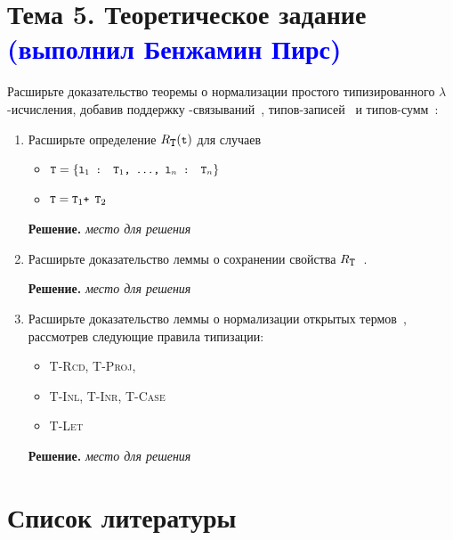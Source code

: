 \documentclass[dvipsnames]{article}
\let\smallcodeOrig\smallcode
\renewcommand{\smallcode}[2][]{%
  \ifmmode
    \if\relax\detokenize{#1}\relax
      \mathchoice{\mbox{\normalfont\small\ttfamily #2}}{\mbox{\normalfont\small\ttfamily #2}}{\mbox{\normalfont\small\ttfamily #2}}{\mbox{\normalfont\small\ttfamily #2}}%
    \else
      \mathchoice{\mbox{\normalfont\small\ttfamily #2}}{\mbox{\normalfont\small\ttfamily #2}}{\mbox{\normalfont\small\ttfamily #2}}{\mbox{\normalfont\small\ttfamily #2}}%
    \fi
  \else
    \smallcodeOrig[#1]{#2}%
  \fi}
\let\codeOrig\code
\renewcommand{\code}[2][]{%
  \ifmmode
    \if\relax\detokenize{#1}\relax
      \mathchoice{\mbox{\normalfont\small\ttfamily #2}}{\mbox{\normalfont\small\ttfamily #2}}{\mbox{\normalfont\small\ttfamily #2}}{\mbox{\normalfont\small\ttfamily #2}}%
    \else
      \mathchoice{\mbox{\normalfont\small\ttfamily #2}}{\mbox{\normalfont\small\ttfamily #2}}{\mbox{\normalfont\small\ttfamily #2}}{\mbox{\normalfont\small\ttfamily #2}}%
    \fi
  \else
    \codeOrig[#1]{#2}%
  \fi}
\begin{document}
\pagestyle{fancy}
\fancyhf{}

\section*{Тема 5. Теоретическое задание \textcolor{blue}{(выполнил Бенжамин Пирс)}}%

Расширьте доказательство теоремы о нормализации простого типизированного $\lambda$-исчисления,
добавив поддержку \code{let}-связываний~\cite[Рис.~11.4]{TaPL-ru}, типов-записей~\cite[Рис.~11.7]{TaPL-ru} и типов-сумм~\cite[Рис.~11.9]{TaPL-ru}:

\begin{enumerate}
  \item Расширьте определение $R_{\smallcode{T}}(\code{t})$ для случаев
  \begin{itemize}
    \item $\code{T} = \{\code{l$_1$ : T$_1$, …, l$_n$ : T$_n$}\}$
    \item $\code{T} = \code{T}_1\code{ + T}_2$
  \end{itemize}

  \color{blue}
  \textbf{Решение.}
  \emph{место для решения}
  \color{black}

  \clearpage

  \item Расширьте доказательство леммы о сохранении свойства $R_{\smallcode{T}}$~\cite[Лемма~12.1.4]{TaPL-ru}.

  \color{blue}
  \textbf{Решение.}
  \emph{место для решения}
  \color{black}

  \clearpage

  \item Расширьте доказательство леммы о нормализации открытых термов~\cite[Лемма~12.1.5]{TaPL-ru},
  рассмотрев следующие правила типизации:
  \begin{itemize}
    \item \textsc{T-Rcd}, \textsc{T-Proj},
    \item \textsc{T-Inl}, \textsc{T-Inr}, \textsc{T-Case}
    \item \textsc{T-Let}
  \end{itemize}

  \color{blue}
  \textbf{Решение.}
  \emph{место для решения}
  \color{black}
\end{enumerate}

\section*{Список литературы}
\printbibliography[heading=none]
\end{document}
